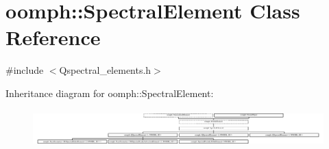 \hypertarget{classoomph_1_1SpectralElement}{}\section{oomph\+:\+:Spectral\+Element Class Reference}
\label{classoomph_1_1SpectralElement}


{\ttfamily \#include $<$Qspectral\+\_\+elements.\+h$>$}

Inheritance diagram for oomph\+:\+:Spectral\+Element\+:\begin{figure}[H]
\begin{center}
\leavevmode
\includegraphics[height=1.455302cm]{classoomph_1_1SpectralElement}
\end{center}
\end{figure}
